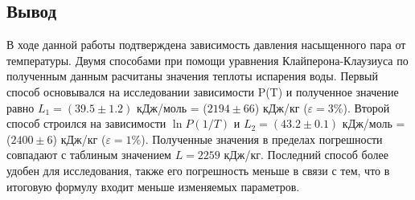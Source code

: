 \documentclass[12pt,a4paper]{article}
\begin{document}
\subsection*{Вывод}
В ходе данной работы подтверждена зависимость давления насыщенного пара от температуры.
Двумя способами при помощи уравнения Клайперона-Клаузиуса по полученным данным расчитаны значения теплоты испарения воды.
Первый способ основывался на исследовании зависимости P(T) и полученное значение равно $L_1 = (39.5 \pm 1.2)$ кДж/моль = ($2194 \pm 66$) кДж/кг ($\varepsilon = 3\%$).
Второй способ строился на зависимости $\ln P(1/T)$ и $L_2 = (43.2 \pm 0.1)$ кДж/моль = ($2400\pm 6$) кДж/кг ($\varepsilon = 1\%$).
Полученные значения в пределах погрешности совпадают с таблиным значением $L = 2259$ кДж/кг.
Последний способ более удобен для исследования, также его погрешность меньше в связи с тем, что в итоговую формулу входит меньше изменяемых параметров.
\end{document}
